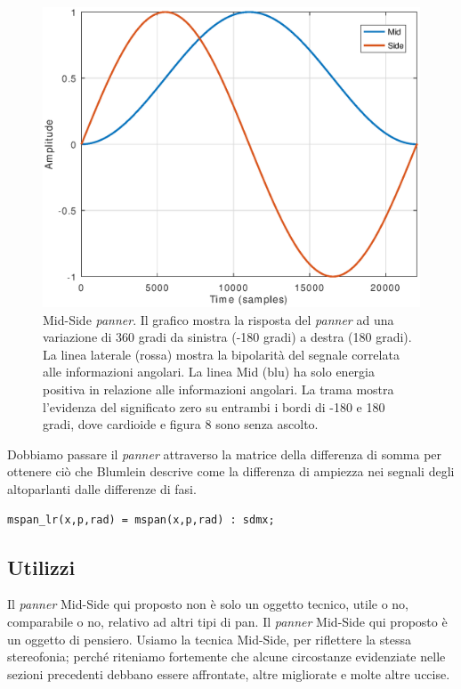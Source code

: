\begin{figure}[h]
\centering
\includegraphics[width=1\columnwidth]{CAPITOLI/1000/IMG/mspan}
\caption{Mid-Side \emph{panner}. Il grafico mostra la risposta del \emph{panner} ad una
variazione di 360 gradi da sinistra (-180 gradi) a destra (180 gradi). La linea
laterale (rossa) mostra la
bipolarità del segnale correlata alle informazioni angolari. La linea Mid (blu)
ha solo energia positiva in relazione alle informazioni angolari. La trama
mostra l'evidenza del significato zero su entrambi i bordi di -180 e 180 gradi,
dove cardioide e figura 8 sono senza ascolto.}
\label{fig:mspan}
\end{figure}

Dobbiamo passare il \emph{panner} attraverso la matrice della differenza di somma per
ottenere ciò che Blumlein descrive come la differenza di ampiezza nei segnali
degli altoparlanti dalle differenze di fasi.

\begin{lstlisting}
mspan_lr(x,p,rad) = mspan(x,p,rad) : sdmx;
\end{lstlisting}

\subsection{Utilizzi}

Il \emph{panner} Mid-Side qui proposto non è solo un oggetto tecnico, utile o no,
comparabile o no, relativo ad altri tipi di pan. Il \emph{panner} Mid-Side qui proposto
è un oggetto di pensiero. Usiamo la tecnica Mid-Side, per riflettere la stessa
stereofonia; perché riteniamo fortemente che alcune circostanze evidenziate
nelle sezioni precedenti debbano essere affrontate, altre migliorate e molte
altre uccise.

